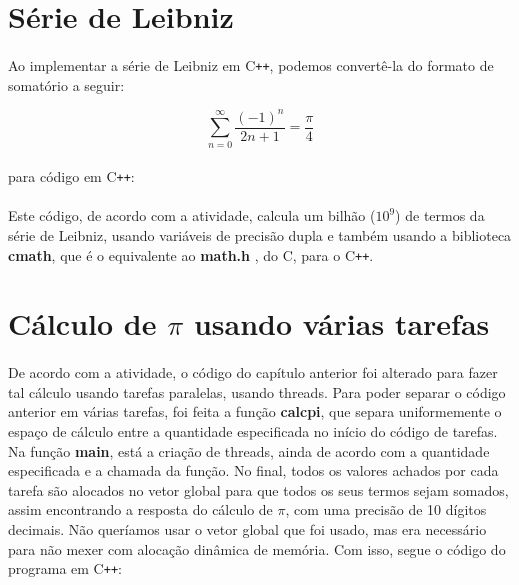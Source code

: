 \documentclass{article}
\begin{document}
\section{Série de Leibniz}
\paragraph{}Ao implementar a série de Leibniz em C\texttt{++}, podemos convertê-la do formato de somatório a seguir:

\[ \sum_{n=0}^{\infty} \frac {(-1)^n}{2n+1} = \frac {\pi}{4} \]

\paragraph{}para código em C\texttt{++}:



\paragraph{}Este código, de acordo com a atividade, calcula um bilhão ($10^{9}$) de termos da série de Leibniz, usando variáveis de precisão dupla e também usando a biblioteca \textbf{cmath}, que é o equivalente ao \textbf{math.h} , do C, para o C\texttt{++}.

\section{Cálculo de $\pi$ usando várias tarefas}

\paragraph{}De acordo com a atividade, o código do capítulo anterior foi alterado para fazer tal cálculo usando tarefas paralelas, usando threads. Para poder separar o código anterior em várias tarefas, foi feita a função \textbf{calcpi}, que separa uniformemente o espaço de cálculo entre a quantidade especificada no início do código de tarefas. Na função \textbf{main}, está a criação de threads, ainda de acordo com a quantidade especificada e a chamada da função. No final, todos os valores achados por cada tarefa são alocados no vetor global para que todos os seus termos sejam somados, assim encontrando a resposta do cálculo de $\pi$, com uma precisão de 10 dígitos decimais. Não queríamos usar o vetor global que foi usado, mas era necessário para não mexer com alocação dinâmica de memória. Com isso, segue o código do programa em C\texttt{++}:
\end{document}

